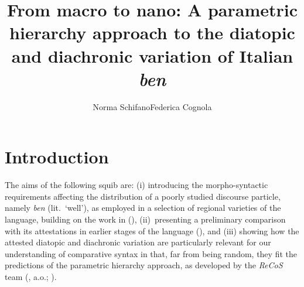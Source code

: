 \documentclass[output=paper]{langsci/langscibook}
\author{Norma Schifano\affiliation{University of Birmingham}\lastand Federica Cognola\affiliation{La Sapienza University, Rome}}
\title{From macro to nano: A parametric hierarchy approach to the diatopic and
diachronic variation of Italian \textit{ben}}
\begin{document}
\glsresetall


\section{Introduction}

The aims of the following squib are: (i) introducing the morpho-syntactic
requirements affecting the distribution of a poorly studied discourse particle,
namely  \emph{ben} (lit.\ ‘well’), as employed in a selection of
regional varieties of the language, building on the work in
\textcite{CognSchi2015,CognSchi2018b,CognSchi2018} (),
(ii)~presenting a preliminary comparison with its attestations in earlier
stages of the language (), and (iii) showing how the
attested diatopic and diachronic variation are particularly relevant for our
understanding of comparative syntax in that, far from being random, they fit
the predictions of the parametric hierarchy approach, as developed by the
\emph{ReCoS} team
(\citealt{Roberts2012,BibRob2012,BibRob2015,BibRob2016,BibHolRobShee2014,BibRobShee2014},
a.o.; ).
\end{document}

